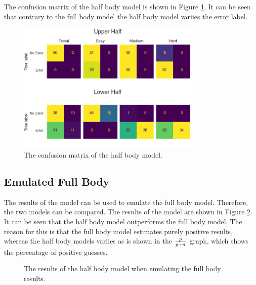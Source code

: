 The confusion matrix of the half body model is shown in Figure \ref{fig:half_body_confusion_matrix}. It can be seen that contrary to the full body model the half body model variies the error label. 

\begin{figure}
  \centering
  \includegraphics[width=0.8\textwidth]{figures/results/confusion/halves.png}
  \caption[Half Body model confusion matrix]{The confusion matrix of the half body model.}
  \label{fig:half_body_confusion_matrix}
\end{figure}

\subsection{Emulated Full Body}

The results of the model can be used to emulate the full body model. Therefore, the two models can be compared. The results of the model are shown in Figure \ref{fig:half_body_emulated_full_body}. It can be seen that the half body model outperforms the full body model. The reason for this is that the full body model estimates purely positive results, whereas the half body models variies as is shown in the ${p}\over{p+n}$ graph, which shows the percentage of positive guesses.

\begin{figure}
  \centering
  \caption[Half Body model with emulated Full Body results]{The results of the half body model when emulating the full body results.}
  \label{fig:half_body_emulated_full_body}
\end{figure}
